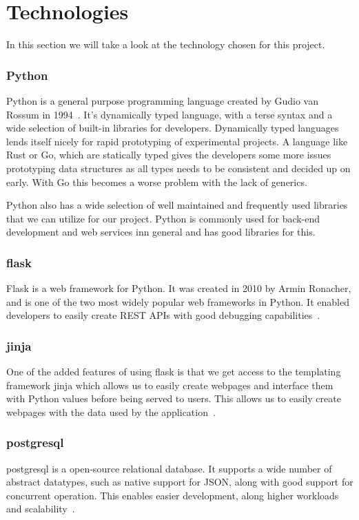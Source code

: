 \documentclass[../Main/thesis.tex]{subfiles}
\begin{document}
\chapter{Technologies}\label{ch:technologies}
In this section we will take a look at the technology chosen for this project.

\subsection*{Python}
Python is a general purpose programming language created by Gudio van Rossum in
1994~\cite{python}. It's dynamically typed language, with a terse syntax and a wide selection
of built-in libraries for developers. Dynamically typed languages lends itself
nicely for rapid prototyping of experimental projects. A language like Rust or
Go, which are statically typed gives the developers some more issues prototyping
data structures as all types needs to be consistent and decided up on early.
With Go this becomes a worse problem with the lack of generics.

Python also has a wide selection of well maintained and frequently used
libraries that we can utilize for our project. Python is commonly used for
back-end development and web services inn general and has good libraries for
this.

\subsection*{flask}
Flask is a web framework for Python. It was created in 2010 by Armin Ronacher,
and is one of the two most widely popular web frameworks in Python. It enabled
developers to easily create REST APIs with good debugging capabilities~\cite{flask}.

\subsection*{jinja}
One of the added features of using flask is that we get access to the templating
framework jinja which allows us to easily create webpages and interface them
with Python values before being served to users. This allows us to easily create
webpages with the data used by the application~\cite{jinja}.

\subsection*{postgresql}
postgresql is a open-source relational database. It supports a wide number of
abstract datatypes, such as native support for JSON, along with good support for
concurrent operation. This enables easier development, along higher workloads
and scalability~\cite{pgsql}.
\end{document}
